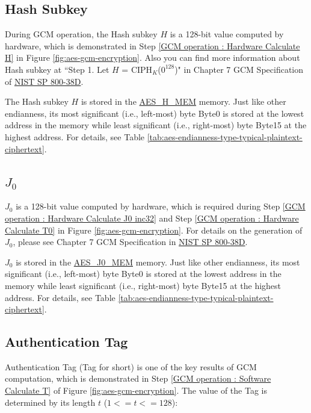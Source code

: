 \documentclass[main\_\_EN.tex]{subfiles}
\begin{document}
\subsection{Hash Subkey}\label{Label Hash subkey}

\label{memdesc:AESHMEM}During GCM operation, the Hash subkey $H$ is a 128-bit value computed by hardware, which is demonstrated in Step \ref{GCM operation : Hardware Calculate H} in Figure \ref{fig:aes-gcm-encryption}. Also you can find more information about Hash subkey at ``Step 1. Let $H$ = CIPH$_K$({$0^{128}$})" in Chapter 7 GCM Specification of \href{https://nvlpubs.nist.gov/nistpubs/Legacy/SP/nistspecialpublication800-38d.pdf}{NIST SP 800-38D}.

The Hash subkey $H$ is stored in the \hyperref[memdesc:AESHMEM]{AES\_H\_MEM} memory. Just like other endianness, its most significant (i.e., left-most) byte Byte0 is stored at the lowest address in the memory while least significant (i.e., right-most) byte Byte15 at the highest address. For details, see Table \ref{tab:aes-endianness-type-typical-plaintext-ciphertext}.


\subsection{\texorpdfstring{$J_0$}{J0}} \label{Label J0}

$J_0$ is a 128-bit value computed by hardware, which is required during Step \ref{GCM operation : Hardware Calculate J0 inc32} and Step \ref{GCM operation : Hardware Calculate T0} in Figure \ref{fig:aes-gcm-encryption}. For details on the generation of $J_0$, please see Chapter 7 GCM Specification in \href{https://nvlpubs.nist.gov/nistpubs/Legacy/SP/nistspecialpublication800-38d.pdf}{NIST SP 800-38D}.


$J_0$ is stored in the \label{memdesc:AESJ0MEM}\hyperref[memdesc:AESJ0MEM]{AES\_J0\_MEM} memory. Just like other endianness, its most significant (i.e., left-most) byte Byte0 is stored at the lowest address in the memory while least significant (i.e., right-most) byte Byte15 at the highest address. For details, see Table \ref{tab:aes-endianness-type-typical-plaintext-ciphertext}.


\subsection{Authentication Tag}\label{Label Authenticated Tag}

Authentication Tag (Tag for short) is one of the key results of GCM computation, which is demonstrated in Step \ref{GCM operation : Software Calculate T} of Figure \ref{fig:aes-gcm-encryption}. The value of the Tag is determined by its length $t$ ($1 <= t <= 128$):
\end{document}

